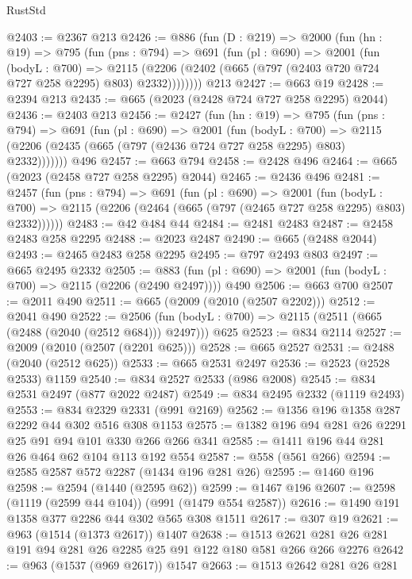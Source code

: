 \begin{lexlean}{RustStd}
\begin{coremodule}
@2403 := @2367 @213
@2426 := @886
    (fun (D : @219) =>
    @2000
      (fun (hn : @19) =>
      @795
        (fun (pns : @794) =>
        @691
          (fun (pl : @690) =>
          @2001
            (fun (bodyL : @700) =>
            @2115 (@2206 (@2402 (@665 (@797 (@2403 @720 @724 @727 @258 @2295) @803) @2332))))))))
    @213
@2427 := @663 @19
@2428 := @2394 @213
@2435 := @665 (@2023 (@2428 @724 @727 @258 @2295) @2044)
@2436 := @2403 @213
@2456 := @2427
    (fun (hn : @19) =>
    @795
      (fun (pns : @794) =>
      @691
        (fun (pl : @690) =>
        @2001
          (fun (bodyL : @700) =>
          @2115 (@2206 (@2435 (@665 (@797 (@2436 @724 @727 @258 @2295) @803) @2332)))))))
    @496
@2457 := @663 @794
@2458 := @2428 @496
@2464 := @665 (@2023 (@2458 @727 @258 @2295) @2044)
@2465 := @2436 @496
@2481 := @2457
    (fun (pns : @794) =>
    @691
      (fun (pl : @690) =>
      @2001
        (fun (bodyL : @700) =>
        @2115 (@2206 (@2464 (@665 (@797 (@2465 @727 @258 @2295) @803) @2332))))))
@2483 := @42 @484 @44
@2484 := @2481 @2483
@2487 := @2458 @2483 @258 @2295
@2488 := @2023 @2487
@2490 := @665 (@2488 @2044)
@2493 := @2465 @2483 @258 @2295
@2495 := @797 @2493 @803
@2497 := @665 @2495 @2332
@2505 := @883 (fun (pl : @690) => @2001 (fun (bodyL : @700) => @2115 (@2206 (@2490 @2497)))) @490
@2506 := @663 @700
@2507 := @2011 @490
@2511 := @665 (@2009 (@2010 (@2507 @2202)))
@2512 := @2041 @490
@2522 := @2506 (fun (bodyL : @700) => @2115 (@2511 (@665 (@2488 (@2040 (@2512 @684))) @2497))) @625
@2523 := @834 @2114
@2527 := @2009 (@2010 (@2507 (@2201 @625)))
@2528 := @665 @2527
@2531 := @2488 (@2040 (@2512 @625))
@2533 := @665 @2531 @2497
@2536 := @2523 (@2528 @2533) @1159
@2540 := @834 @2527 @2533 (@986 @2008)
@2545 := @834 @2531 @2497 (@877 @2022 @2487)
@2549 := @834 @2495 @2332 (@1119 @2493)
@2553 := @834 @2329 @2331 (@991 @2169)
@2562 := @1356 @196 @1358 @287 @2292 @44 @302 @516 @308 @1153
@2575 := @1382 @196 @94 @281 @26 @2291 @25 @91 @94 @101 @330 @266 @266 @341
@2585 := @1411 @196 @44 @281 @26 @464 @62 @104 @113 @192 @554
@2587 := @558 (@561 @266)
@2594 := @2585 @2587 @572 @2287 (@1434 @196 @281 @26)
@2595 := @1460 @196
@2598 := @2594 (@1440 (@2595 @62))
@2599 := @1467 @196
@2607 := @2598 (@1119 (@2599 @44 @104)) (@991 (@1479 @554 @2587))
@2616 := @1490 @191 @1358 @377 @2286 @44 @302 @565 @308 @1511
@2617 := @307 @19
@2621 := @963 (@1514 (@1373 @2617)) @1407
@2638 := @1513 @2621 @281 @26 @281 @191 @94 @281 @26 @2285 @25 @91 @122 @180 @581 @266 @266 @2276
@2642 := @963 (@1537 (@969 @2617)) @1547
@2663 := @1513
    @2642
    @281
    @26
    @281

\end{coremodule}
\end{lexlean}
